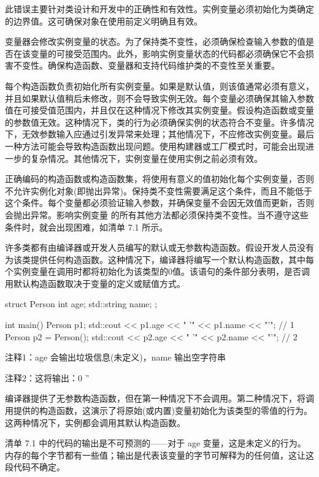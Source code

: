 此错误主要针对类设计和开发中的正确性和有效性。实例变量必须初始化为类确定的边界值。这可确保对象在使用前定义明确且有效。

变量器会修改实例变量的状态。为了保持类不变性，必须确保检查输入参数的值是否在该变量的可接受范围内。此外，影响实例变量状态的代码都必须确保它不会损害不变性。确保构造函数、变量器和支持代码维护类的不变性至关重要。

每个构造函数负责初始化所有实例变量。如果是默认值，则该值通常必须有意义，并且如果默认值稍后未修改，则不会导致实例无效。每个变量必须确保其输入参数值在可接受值范围内，并且仅在这种情况下修改其实例变量。假设构造函数或变量的参数值无效。这种情况下，类的行为必须确保实例的状态符合不变量。许多情况下，无效参数输入应通过引发异常来处理；其他情况下，不应修改实例变量。最后一种方法可能会导致构造函数出现问题。使用构建器或工厂模式时，可能会出现进一步的复杂情况。其他情况下，实例变量在使用实例之前必须有效。


正确编码的构造函数或构造函数集，将使用有意义的值初始化每个实例变量，否则不允许实例化对象(即抛出异常)。保持类不变性需要满足这个条件，而且不能低于这个条件。每个变量都必须验证输入参数，并确保变量不会因无效值而更新，否则会抛出异常。影响实例变量 的所有其他方法都必须保持类不变性。当不遵守这些条件时，就会出现困难，如清单 7.1 所示。

许多类都有由编译器或开发人员编写的默认或无参数构造函数。假设开发人员没有为该类提供任何构造函数。这种情况下，编译器将编写一个默认构造函数，其中每个实例变量在调用时都将初始化为该类型的0值。该语句的条件部分表明，是否调用默认构造函数取决于变量的定义或赋值方式。


\begin{cpp}
struct Person {
  int age;
  std::string name;
};

int main() {
  Person p1;
  std::cout << p1.age << " '" << p1.name << "'\n"; // 1
  Person p2 = Person();
  std::cout << p2.age << " '" << p2.name << "'\n"; // 2
}
\end{cpp}

{\footnotesize
注释1：age 会输出垃圾信息(未定义)，name 输出空字符串

注释2：这将输出：0 ''
}

编译器提供了无参数构造函数，但在第一种情况下不会调用。第二种情况下，将调用提供的构造函数，这演示了将原始(或内置)变量初始化为该类型的零值的行为。这两种情况下，实例都会调用其默认构造函数。

清单 7.1 中的代码的输出是不可预测的——对于 age 变量，这是未定义的行为。内存的每个字节都有一些值；输出是代表该变量的字节可解释为的任何值，这让这段代码不确定。

